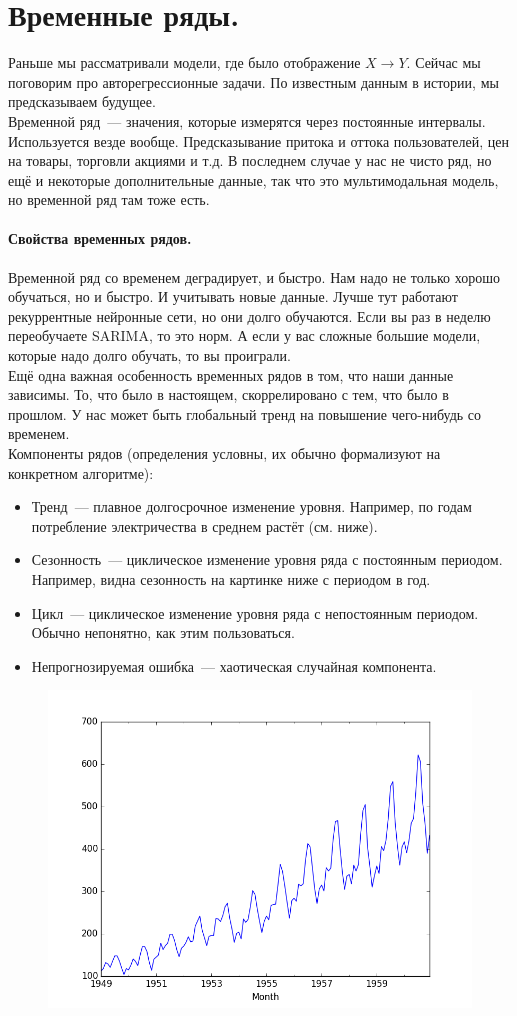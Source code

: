 \documentclass{article}
\begin{document}
    \section{Временные ряды.}
    Раньше мы рассматривали модели, где было отображение $X\to Y$. Сейчас мы поговорим про авторегрессионные задачи. По известным данным в истории, мы предсказываем будущее.\\
    Временной ряд~--- значения, которые измерятся через постоянные интервалы. Используется везде вообще. Предсказывание притока и оттока пользователей, цен на товары, торговли акциями и т.д. В последнем случае у нас не чисто ряд, но ещё и некоторые дополнительные данные, так что это мультимодальная модель, но временной ряд там тоже есть.
    \paragraph{Свойства временных рядов.}
    Временной ряд со временем деградирует, и быстро. Нам надо не только хорошо обучаться, но и быстро. И учитывать новые данные. Лучше тут работают рекуррентные нейронные сети, но они долго обучаются. Если вы раз в неделю переобучаете SARIMA, то это норм. А если у вас сложные большие модели, которые надо долго обучать, то вы проиграли.\\
    Ещё одна важная особенность временных рядов в том, что наши данные зависимы. То, что было в настоящем, скоррелировано с тем, что было в прошлом. У нас может быть глобальный тренд на повышение чего-нибудь со временем.\\
    Компоненты рядов (определения условны, их обычно формализуют на конкретном алгоритме):
    \begin{itemize}
        \item Тренд~--- плавное долгосрочное изменение уровня. Например, по годам потребление электричества в  среднем растёт (см. ниже).
        \item Сезонность~--- циклическое изменение уровня ряда с постоянным периодом. Например, видна сезонность на картинке ниже с периодом в год.
        \item Цикл~--- циклическое изменение уровня ряда с непостоянным периодом. Обычно непонятно, как этим пользоваться.
        \item Непрогнозируемая ошибка~--- хаотическая случайная компонента.
    \end{itemize}
    \begin{figure}[H]
        \includegraphics[width=.7\linewidth]{"Images/Потребление электричества по годам в Австралии"}
    \end{figure}\noindent
\end{document}
